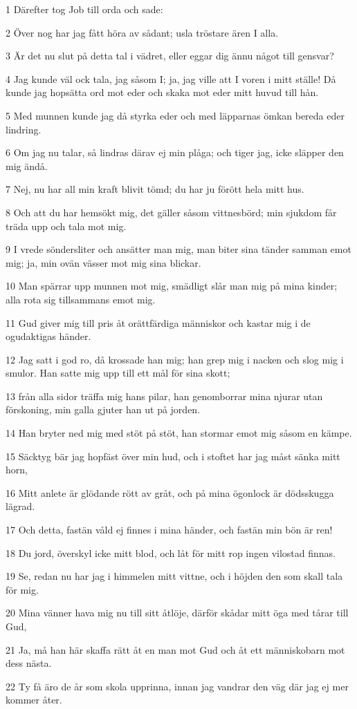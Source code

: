 \par 1 Därefter tog Job till orda och sade:
\par 2 Över nog har jag fått höra av sådant; usla tröstare ären I alla.
\par 3 Är det nu slut på detta tal i vädret, eller eggar dig ännu något till gensvar?
\par 4 Jag kunde väl ock tala, jag såsom I; ja, jag ville att I voren i mitt ställe! Då kunde jag hopsätta ord mot eder och skaka mot eder mitt huvud till hån.
\par 5 Med munnen kunde jag då styrka eder och med läpparnas ömkan bereda eder lindring.
\par 6 Om jag nu talar, så lindras därav ej min plåga; och tiger jag, icke släpper den mig ändå.
\par 7 Nej, nu har all min kraft blivit tömd; du har ju förött hela mitt hus.
\par 8 Och att du har hemsökt mig, det gäller såsom vittnesbörd; min sjukdom får träda upp och tala mot mig.
\par 9 I vrede söndersliter och ansätter man mig, man biter sina tänder samman emot mig; ja, min ovän vässer mot mig sina blickar.
\par 10 Man spärrar upp munnen mot mig, smädligt slår man mig på mina kinder; alla rota sig tillsammans emot mig.
\par 11 Gud giver mig till pris åt orättfärdiga människor och kastar mig i de ogudaktigas händer.
\par 12 Jag satt i god ro, då krossade han mig; han grep mig i nacken och slog mig i smulor. Han satte mig upp till ett mål för sina skott;
\par 13 från alla sidor träffa mig hans pilar, han genomborrar mina njurar utan förskoning, min galla gjuter han ut på jorden.
\par 14 Han bryter ned mig med stöt på stöt, han stormar emot mig såsom en kämpe.
\par 15 Säcktyg bär jag hopfäst över min hud, och i stoftet har jag måst sänka mitt horn,
\par 16 Mitt anlete är glödande rött av gråt, och på mina ögonlock är dödsskugga lägrad.
\par 17 Och detta, fastän våld ej finnes i mina händer, och fastän min bön är ren!
\par 18 Du jord, överskyl icke mitt blod, och låt för mitt rop ingen vilostad finnas.
\par 19 Se, redan nu har jag i himmelen mitt vittne, och i höjden den som skall tala för mig.
\par 20 Mina vänner hava mig nu till sitt åtlöje, därför skådar mitt öga med tårar till Gud,
\par 21 Ja, må han här skaffa rätt åt en man mot Gud och åt ett människobarn mot dess nästa.
\par 22 Ty få äro de år som skola upprinna, innan jag vandrar den väg där jag ej mer kommer åter.

